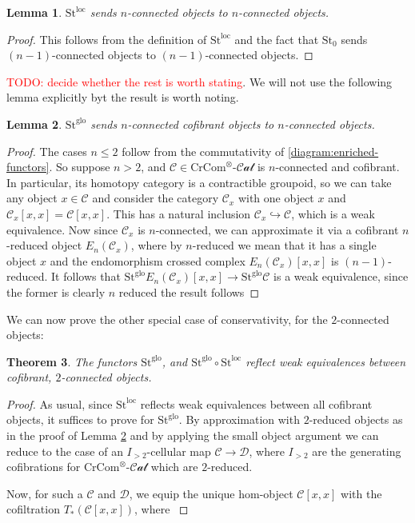 \documentclass[12pt]{article}
\newtheorem{theorem}{Theorem}[section]
\newtheorem{lemma}[theorem]{Lemma}
\theoremstyle{definition}
\newcommand{\TODO}[1]{\textcolor{red}{TODO: {#1}}}
\newcommand{\C}{\mathcal{C}}
\newcommand{\D}{\mathcal{D}}
\newcommand{\crcom}{\text{CrCom}}
\newcommand{\tensorcrossedcat}{\crcom^\otimes\text{-}\mathcal{Cat}}
\newcommand{\st}{\text{St}}
\newcommand{\leftone}{\st^{\text{loc}}}
\newcommand{\lefttwo}{\st^{\text{glo}}}
\begin{document}
	\begin{lemma}\label{lem:local-strictification-preserves-connectedness}
		$\leftone$ sends $n$-connected objects to $n$-connected objects.
	\end{lemma}
	\begin{proof}
		This follows from the definition of $\leftone$ and the fact that $\st_0$ sends $(n-1)$-connected objects to $(n-1)$-connected objects. 
	\end{proof}
	\TODO{decide whether the rest is worth stating}. 
	We will not use the following lemma explicitly byt the result is worth noting. 
	\begin{lemma}\label{lem:global-strictification-preserves-connectedness}
		$\lefttwo$ sends $n$-connected cofibrant objects to $n$-connected objects.
	\end{lemma}
	\begin{proof}
		The cases $n \le 2$ follow from the commutativity of \ref{diagram:enriched-functors}. So suppose $n > 2$, and $\C \in \tensorcrossedcat$ is $n$-connected and cofibrant. In particular, its homotopy category is a contractible groupoid, so we can take any object $x \in \C$ and consider the category $\C_x$ with one object $x$ and $\C_x[x,x] = \C[x,x]$. This has a natural inclusion $\C_x \hookrightarrow \C$, which is a weak equivalence. Now since $\C_x$ is $n$-connected, we can approximate it via a cofibrant $n$-reduced object $E_n(\C_x)$, where by $n$-reduced we mean that it has a single object $x$ and the endomorphism crossed complex $E_n(\C_x)[x,x]$ is $(n-1)$-reduced. It follows that $\lefttwo E_n(\C_x)[x,x] \to \lefttwo\C$ is a weak equivalence, since the former is clearly $n$ reduced the result follows
	\end{proof}
	We can now prove the other special case of conservativity, for the $2$-connected objects:
	\begin{theorem}
		The functors $\lefttwo$, and $\lefttwo \circ \leftone$ reflect weak equivalences between cofibrant, $2$-connected objects.
	\end{theorem}
	\begin{proof}
		As usual, since $\leftone$ reflects weak equivalences between all cofibrant objects, it suffices to prove for $\lefttwo$. By approximation with $2$-reduced objects as in the proof of Lemma \ref{lem:global-strictification-preserves-connectedness} and by applying the small object argument we can reduce to the case of an $I_{>2}$-cellular map $\C \to \D$, where $I_{>2}$ are the generating cofibrations for $\tensorcrossedcat$ which are $2$-reduced. 
		\par Now, for such a $\C$ and $\D$, we equip the unique hom-object $\C[x,x]$ with the cofiltration $T_*(\C[x,x])$, where $$
	\end{proof}
\end{document}
